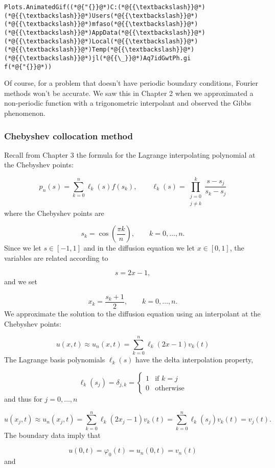 \documentclass[12pt,landscape]{article}
\begin{document}
{\begin{lstlisting}
Plots.AnimatedGif((*@{"{}}@*)C:(*@{{\textbackslash}}@*)(*@{{\textbackslash}}@*)Users(*@{{\textbackslash}}@*)(*@{{\textbackslash}}@*)mfaso(*@{{\textbackslash}}@*)(*@{{\textbackslash}}@*)AppData(*@{{\textbackslash}}@*)(*@{{\textbackslash}}@*)Local(*@{{\textbackslash}}@*)(*@{{\textbackslash}}@*)Temp(*@{{\textbackslash}}@*)(*@{{\textbackslash}}@*)jl(*@{{\_}}@*)Aq7idGwtPh.gi
f(*@{"{}}@*))
\end{lstlisting}


Of course, for a problem that doesn't have periodic boundary conditions, Fourier methods won't be accurate.  We saw this in Chapter 2 when we approximated a non-periodic function with a trigonometric interpolant and observed the Gibbs phenomenon. 

\subsubsection{Chebyshev collocation method}
Recall from Chapter 3 the formula for the Lagrange interpolating polynomial at the Chebyshev points:

\[
p_{n}(s) = \sum_{k = 0}^{n}\ell_k(s)f(s_k), \qquad \ell_k(s) = \prod_{\substack{j=0\\ j \neq k}}^{k}\frac{s-s_j}{s_k-s_j}
\]
where the Chebyshev points are

\[
s_k = \cos\left(\frac{\pi k}{n} \right), \qquad k = 0, \ldots, n.
\]
Since we let $s \in [-1, 1]$ and in the diffusion equation we let $x \in [0, 1]$, the variables are related according to

\[
s = 2x - 1,
\]
and we set

\[
x_k = \frac{s_k+1}{2}, \qquad k = 0, \ldots, n.
\]
We approximate the solution to the diffusion equation using an interpolant at the Chebyshev points:

\[
u(x,t) \approx u_n(x,t) = \sum_{k=0}^n \ell_k(2x - 1)v_k(t)
\]
The Lagrange basis polynomials $\ell_k(s)$ have the delta interpolation property,

\[
\ell_k(s_j) = \delta_{j,k} = \begin{cases}
1 & \text{if } k = j \\
0 & \text{otherwise}
\end{cases}
\]
and thus for $j = 0, \ldots, n$

\[
u(x_j,t) \approx u_n(x_j,t)= \sum_{k=0}^n \ell_k(2x_j - 1)v_k(t) = \sum_{k=0}^n \ell_k(s_j)v_k(t) = v_j(t).
\]
The boundary data imply that

\[
u(0,t) = \varphi_0(t) = u_n(0,t) = v_n(t)
\]
and

}
\end{document}
